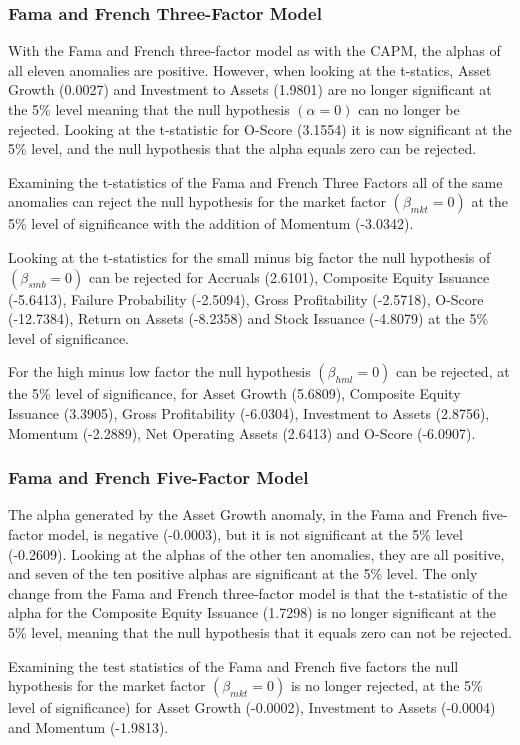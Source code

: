 \documentclass[12pt, a4paper, oneside]{article}
\begin{document}
\subsubsection{Fama and French Three-Factor Model}
With the Fama and French three-factor model as with the CAPM, the alphas of all eleven anomalies are positive. However, when looking at the t-statics, Asset Growth (0.0027) and Investment to Assets (1.9801) are no longer significant at the 5\% level meaning that the null hypothesis $(\alpha=0)$ can no longer be rejected. Looking at the t-statistic for O-Score (3.1554) it is now significant at the 5\% level, and the null hypothesis that the alpha equals zero can be rejected. 

Examining the t-statistics of the Fama and French Three Factors all of the same anomalies can reject the null hypothesis for the market factor $(\beta_{mkt}= 0)$ at the 5\% level of significance with the addition of Momentum (-3.0342). 

Looking at the t-statistics for the small minus big factor the null hypothesis of $(\beta_{smb}= 0)$ can be rejected for Accruals (2.6101), Composite Equity Issuance (-5.6413), Failure Probability (-2.5094), Gross Profitability (-2.5718), O-Score (-12.7384), Return on Assets (-8.2358) and Stock Issuance (-4.8079) at the 5\% level of significance. 

For the high minus low factor the null hypothesis $(\beta_{hml}= 0)$ can be rejected, at the 5\% level of significance, for Asset Growth (5.6809), Composite Equity Issuance (3.3905), Gross Profitability (-6.0304), Investment to Assets (2.8756), Momentum (-2.2889), Net Operating Assets (2.6413) and O-Score (-6.0907).

\subsubsection{Fama and French Five-Factor Model}
The alpha generated by the Asset Growth anomaly, in the Fama and French five-factor model, is negative (-0.0003), but it is not significant at the 5\% level (-0.2609). Looking at the alphas of the other ten anomalies, they are all positive, and seven of the ten positive alphas are significant at the 5\% level. The only change from the Fama and French three-factor model is that the t-statistic of the alpha for the Composite Equity Issuance (1.7298) is no longer significant at the 5\% level, meaning that the null hypothesis that it equals zero can not be rejected.

Examining the test statistics of the Fama and French five factors the null hypothesis for the market factor $(\beta_{mkt}= 0)$ is no longer rejected, at the 5\% level of significance) for Asset Growth (-0.0002), Investment to Assets (-0.0004) and Momentum (-1.9813). 
\end{document}
